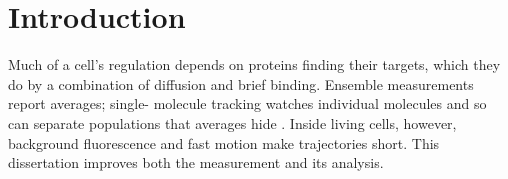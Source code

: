 \chapter{Introduction}
\label{ch:introduction}

Much of a cell's regulation depends on proteins finding their targets, which they do by a
combination of diffusion and brief binding. Ensemble measurements report averages; single-
molecule tracking watches individual molecules and so can separate populations that averages
hide \citep{manley2008}. Inside living cells, however, background fluorescence and fast motion
make trajectories short. This dissertation improves both the measurement and its analysis.
